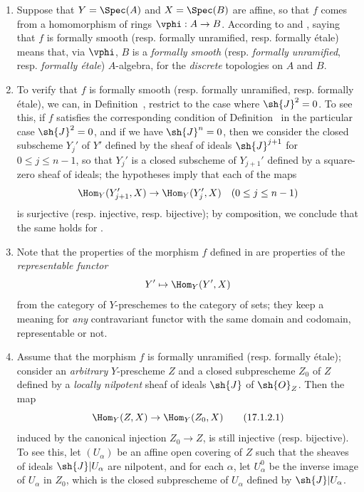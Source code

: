 \begin{remark}[17.1.2]
\label{IV.17.1.2}
\medskip\noindent
\begin{enumerate}
  \item[(i)] Suppose that $Y=\Spec(A)$ and $X=\Spec(B)$ are affine, so that $f$ comes from a homomorphism of rings $\vphi:A\to B$. 
    According to  and , saying that $f$ is formally smooth (resp. formally unramified, resp. formally \'etale) means that, via $\vphi$, $B$ is a \emph{formally smooth} (resp. \emph{formally unramified}, resp. \emph{formally \'etale}) $A$-algebra, for the \emph{discrete} topologies on $A$ and $B$.
  \item[(ii)] To verify that $f$ is formally smooth (resp. formally unramified, resp. formally \'etale), we can, in Definition~, restrict to the case where $\sh{J}^2=0$.
  To see this, if $f$ satisfies the corresponding condition of Definition~ in the particular case $\sh{J}^2=0$, and if we have $\sh{J}^n=0$, then we consider the closed subscheme $Y_j'$ of $Y'$ defined by the sheaf of ideals $\sh{J}^{j+1}$ for $0\leq j\leq n-1$, so that $Y_j'$ is a closed subscheme of $Y_{j+1}'$ defined by a square-zero sheaf of ideals;
the hypotheses imply that each of the maps
\[
  \Hom_Y(Y_{j+1}',X)\to\Hom_Y(Y_j',X)\quad(0\leq j\leq n-1) 
\]
is surjective (resp. injective, resp. bijective);
by composition, we conclude that the same holds for .
\item[(iii)] Note that the properties of the morphism $f$ defined in  are properties of the \emph{representable functor} 
\[
  Y'\mapsto\Hom_Y(Y',X) 
\]
from the category of $Y$-preschemes to the category of sets;
they keep a meaning for \emph{any} contravariant functor with the same domain and codomain, representable or not.
\item[(iv)] Assume that the morphism $f$ is formally unramified (resp. formally \'etale);
consider an \emph{arbitrary} $Y$-prescheme $Z$ and a closed subprescheme $Z_0$ of $Z$ defined by a \emph{locally nilpotent} sheaf of ideals $\sh{J}$ of $\sh{O}_Z$. 
Then the map
\[
\label{IV.17.1.2.1}  
  \Hom_Y(Z,X)\to\Hom_Y(Z_0,X)
  \tag{17.1.2.1}
\]
induced by the canonical injection $Z_0\to Z$, is still injective (resp. bijective).
To see this, let $(U_\alpha)$ be an affine open covering of $Z$ such that the sheaves of ideals $\sh{J}|U_\alpha$ are nilpotent, and for each $\alpha$, let $U_\alpha^0$ be the inverse image of $U_\alpha$ in $Z_0$, which is the closed subprescheme of $U_\alpha$ defined by $\sh{J}|U_\alpha$.

\end{enumerate}
\end{remark}
